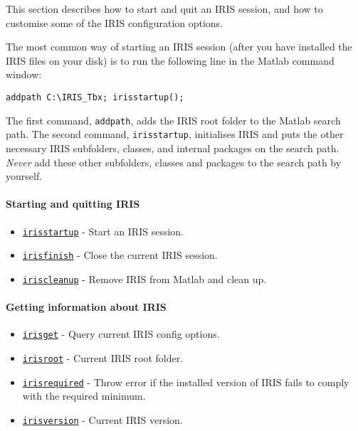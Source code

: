 

	This section describes how to start and quit an IRIS session, and how to
customise some of the IRIS configuration options.

The most common way of starting an IRIS session (after you have
installed the IRIS files on your disk) is to run the following line in
the Matlab command window:

\begin{verbatim}
addpath C:\IRIS_Tbx; irisstartup();
\end{verbatim}

The first command, \texttt{addpath}, adds the IRIS root folder to the
Matlab search path. The second command, \texttt{irisstartup},
initialises IRIS and puts the other necessary IRIS subfolders, classes,
and internal packages on the search path. \emph{Never} add these other
subfolders, classes and packages to the search path by yourself.

\paragraph{Starting and quitting IRIS}

\begin{itemize}
\itemsep1pt\parskip0pt
\item
  \href{config/irisstartup}{\texttt{irisstartup}} - Start an IRIS
  session.
\item
  \href{config/irisfinish}{\texttt{irisfinish}} - Close the current IRIS
  session.
\item
  \href{config/iriscleanup}{\texttt{iriscleanup}} - Remove IRIS from
  Matlab and clean up.
\end{itemize}

\paragraph{Getting information about
IRIS}

\begin{itemize}
\itemsep1pt\parskip0pt
\item
  \href{config/irisget}{\texttt{irisget}} - Query current IRIS config
  options.
\item
  \href{config/irisroot}{\texttt{irisroot}} - Current IRIS root folder.
\item
  \href{config/irisrequired}{\texttt{irisrequired}} - Throw error if the
  installed version of IRIS fails to comply with the required minimum.
\item
  \href{config/irisversion}{\texttt{irisversion}} - Current IRIS
  version.
\end{itemize}

